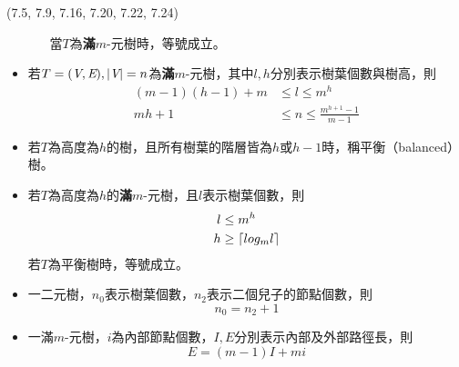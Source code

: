 \begin{theorem}{(7.5, 7.9, 7.16, 7.20, 7.22, 7.24)}
\begin{itemize}
\begin{itemize}
            當$T$為\textbf{滿}$m$-元樹時，等號成立。
        \end{itemize}
        \item 若$T = (\textit{V}, \textit{E}), |\textit{V}| = n$為\textbf{滿}$m$-元樹，其中$l, h$分別表示樹葉個數與樹高，則\begin{equation}
            \begin{aligned}
                (m - 1)(h - 1) + m & \le l \le m^h \\
                mh+ 1 & \le n \le \frac{m^{h + 1} - 1}{m - 1}
            \end{aligned}
        \end{equation}
        \item 若$T$為高度為$h$的樹，且所有樹葉的階層皆為$h$或$h - 1$時，稱平衡（balanced）樹。
        \item 若$T$為高度為$h$的\textbf{滿}$m$-元樹，且$l$表示樹葉個數，則\begin{equation}
            \begin{aligned}
                l & \le m^h \\
                h & \ge \lceil log_{m}l\rceil
            \end{aligned}
        \end{equation} 若$T$為平衡樹時，等號成立。
        \item 一二元樹，$n_0$表示樹葉個數，$n_2$表示二個兒子的節點個數，則\begin{equation}
            n_0 = n_2 + 1
        \end{equation}
        \item 一滿$m$-元樹，$i$為內部節點個數，$I, E$分別表示內部及外部路徑長，則\begin{equation}
            E = (m - 1)I + mi
        \end{equation}
    \end{itemize}
\end{theorem}

